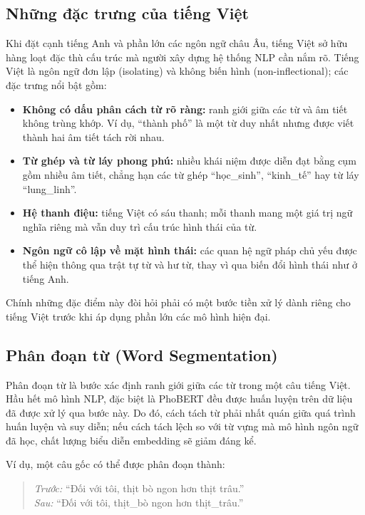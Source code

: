 \subsection{Những đặc trưng của tiếng Việt}

Khi đặt cạnh tiếng Anh và phần lớn các ngôn ngữ châu Âu, tiếng Việt sở hữu hàng loạt đặc thù cấu trúc mà người xây dựng hệ thống NLP cần nắm rõ. Tiếng Việt là ngôn ngữ đơn lập (isolating) và không biến hình (non-inflectional); các đặc trưng nổi bật gồm:

\begin{itemize}[leftmargin=2em]
  \item \textbf{Không có dấu phân cách từ rõ ràng:} ranh giới giữa các từ và âm tiết không trùng khớp. Ví dụ, ``thành phố'' là một từ duy nhất nhưng được viết thành hai âm tiết tách rời nhau.
  \item \textbf{Từ ghép và từ láy phong phú:} nhiều khái niệm được diễn đạt bằng cụm gồm nhiều âm tiết, chẳng hạn các từ ghép ``học\_sinh'', ``kinh\_tế'' hay từ láy ``lung\_linh''.
  \item \textbf{Hệ thanh điệu:} tiếng Việt có sáu thanh; mỗi thanh mang một giá trị ngữ nghĩa riêng mà vẫn duy trì cấu trúc hình thái của từ.
  \item \textbf{Ngôn ngữ cô lập về mặt hình thái:} các quan hệ ngữ pháp chủ yếu được thể hiện thông qua trật tự từ và hư từ, thay vì qua biến đổi hình thái như ở tiếng Anh.
\end{itemize}

Chính những đặc điểm này đòi hỏi phải có một bước tiền xử lý dành riêng cho tiếng Việt trước khi áp dụng phần lớn các mô hình hiện đại.

\subsection{Phân đoạn từ (Word Segmentation)}\label{sec:vncore_2018}

Phân đoạn từ là bước xác định ranh giới giữa các từ trong một câu tiếng Việt. Hầu hết mô hình NLP, đặc biệt là PhoBERT đều được huấn luyện trên dữ liệu đã được xử lý qua bước này. Do đó, cách tách từ phải nhất quán giữa quá trình huấn luyện và suy diễn; nếu cách tách lệch so với từ vựng mà mô hình ngôn ngữ đã học, chất lượng biểu diễn embedding sẽ giảm đáng kể.

Ví dụ, một câu gốc có thể được phân đoạn thành:
\begin{quote}

  \textit{Trước:} ``Đối với tôi, thịt bò ngon hơn thịt trâu.'' \\
  \textit{Sau:} ``Đối với tôi, thịt\_bò ngon hơn thịt\_trâu.''

\end{quote}

